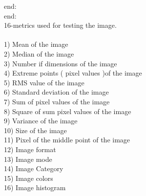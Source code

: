 \documentclass[10pt,a4paper]{article}
\begin{document}
\tab end: \\
end: \\    

16-metrics used for testing the image.\\ \\
1) Mean of the image \\
2) Median of the image \\
3) Number if dimensions of the image \\
4) Extreme points ( pixel values )of the image \\
5) RMS value of the image \\
6) Standard deviation of the image \\
7) Sum of pixel values of the image \\
8) Square of sum pixel values of the image \\
9) Variance of the image \\
10) Size of the image \\
11) Pixel of the middle point of the image \\
12) Image format \\
13) Image mode \\
14) Image Category \\
15) Image colors \\
16) Image histogram \\ \\
\end{document}
